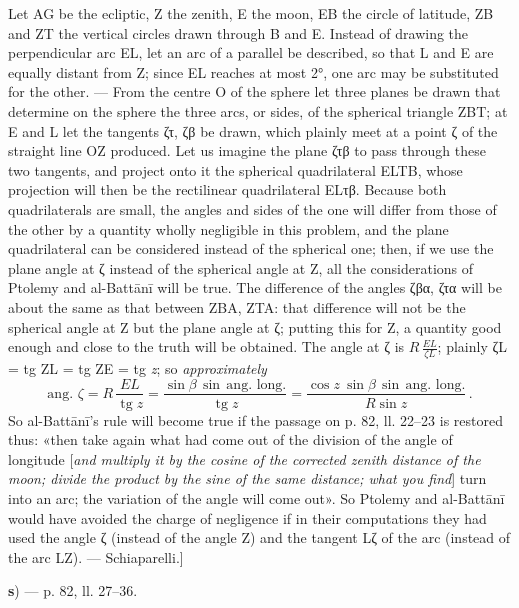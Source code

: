 \documentclass[11pt]{article}
\newcommand{\Pg}[1]{\marginpar{\footnotesize\color{gray}#1}}
\begin{document}
\par \Pg{I 261}Let AG be the ecliptic, Z the zenith, E the moon, EB the circle of latitude, ZB and ZT the vertical circles drawn through B and E. Instead of drawing the perpendicular arc EL, let an arc of a parallel be described, so that L and E are equally distant from Z; since EL reaches at most 2°, one arc may be substituted for the other. — From the centre O of the sphere let three planes be drawn that determine on the sphere the three arcs, or sides, of the spherical triangle ZBT; at E and L let the tangents {\greekfont ζτ, ζβ} be drawn, which plainly meet at a point {\greekfont ζ} of the straight line OZ produced. Let us imagine the plane {\greekfont ζτβ} to pass through these two tangents, and project onto it the spherical quadrilateral ELTB, whose projection will then be the rectilinear quadrilateral EL{\greekfont τβ}. Because both quadrilaterals are small, the angles and sides of the one will differ from those of the other by a quantity wholly negligible in this problem, and the plane quadrilateral can be considered instead of the spherical one; then, if we use the plane angle at {\greekfont ζ} instead of the spherical angle at Z, all the considerations of Ptolemy and al-Battānī will be true. The difference of the angles {\greekfont ζβα, ζτα} will be about the same as that between ZBA, ZTA: that difference will not be the spherical angle at Z but the plane angle at {\greekfont ζ}; putting this for Z, a quantity good enough and close to the truth will be obtained. The angle at {\greekfont ζ} is $R\,\frac{EL}{\zeta L}$; plainly {\greekfont ζ}L = tg ZL = tg ZE = tg \emph{z}; so \emph{approximately} \[ \text{ang. }\zeta = R\,\frac{EL}{\operatorname{tg} z} = \frac{\sin\beta\,\sin\,\text{ang. long.}}{\operatorname{tg} z} = \frac{\cos z\ \sin\beta\,\sin\,\text{ang. long.}}{R\sin z}\,. \] So al-Battānī's rule will become true if the passage on p. 82, ll. 22–23 is restored thus: «then take again what had come out of the division of the angle of longitude [\emph{and multiply it by the cosine of the corrected zenith distance of the moon; divide the product by the sine of the same distance; what you find}] turn into an arc; the variation of the angle will come out». So Ptolemy and al-Battānī would have avoided the charge of negligence if in their computations they had used the angle {\greekfont ζ} (instead of the angle Z) and the tangent L{\greekfont ζ} of the arc (instead of the arc LZ). — Schiaparelli.]\par
\par\begin{center}\textbf{s}) — p. 82, ll. 27–36.\end{center}
\end{document}
